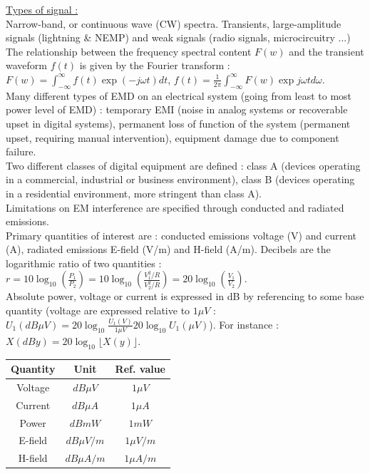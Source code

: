 \documentclass[../main.tex]{subfiles}
\begin{document}
\quad \underline{Types of signal :}\\
Narrow-band, or continuous wave (CW) spectra. Transients, large-amplitude signals (lightning \& NEMP) and weak signals (radio signals, microcircuitry ...)\\

The relationship between the frequency spectral content $F(w)$ and the transient waveform $f(t)$ is given by the Fourier transform : $F(w) = \int_{-\infty}^\infty f(t) \exp(-j\omega t)dt$, $f(t) = \frac{1}{2\pi} \int_{-\infty}^\infty F(w) \exp{j\omega t}d\omega$.\\

Many different types of EMD on an electrical system (going from least to most power level of EMD) : temporary EMI (noise in analog systems or recoverable upset in digital systems), permanent loss of function of the system (permanent upset, requiring manual intervention), equipment damage due to component failure. \\

Two different classes of digital equipment are defined : class A (devices operating in a commercial, industrial or business environment), class B (devices operating in a residential environment, more stringent than class A).\\

Limitations on EM interference are specified through conducted and radiated emissions.\\

Primary quantities of interest are : conducted emissions voltage (V) and current (A), radiated emissions E-field (V/m) and H-field (A/m). Decibels are the logarithmic ratio of two quantities : $r = 10\log_{10}(\frac{P_1}{P_2}) = 10\log_{10}(\frac{V_1^2/R}{V_2^2/R}) = 20\log_{10}(\frac{V_1}{V_2})$.\\
Absolute power, voltage or current is expressed in dB by referencing to some base quantity (voltage are expressed relative to $1\mu V$ : $U_1(dB\mu V) = 20\log_{10} \frac{U_1(V)}{1\mu V} 20 \log_{10} U_1(\mu V)$). For instance : $X(dBy) = 20\log_{10} \lfloor X(y)\rfloor$. \begin{table}[hbt!]
    \centering
    \begin{tabular}{c|c|c}
        Quantity & Unit & Ref. value \\ \hline
        Voltage & $dB\mu V$ & $1\mu V$\\
        Current & $dB\mu A$ & $1\mu A$\\
        Power & $dBmW$ & $1mW$\\
        E-field & $dB\mu V/m$ & $1\mu V/m$\\
        H-field & $dB\mu A/m$ & $1\mu A/m$\\
    \end{tabular}
\end{table}
\end{document}
